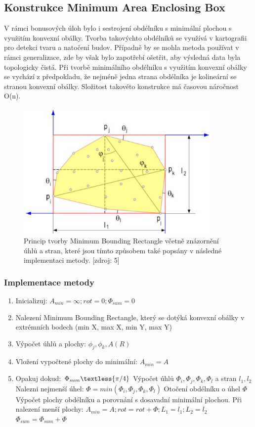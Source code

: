 \documentclass[a4paper, 12pt]{article}
\begin{document}
\subsection{Konstrukce Minimum Area Enclosing Box}
V rámci bonusových úloh bylo i sestrojení obdélníku s minimální plochou s využitím konvexní obálky. Tvorba takovýchto obdélníků se využívá v kartografii pro detekci tvaru a natočení budov. Případně by se mohla metoda používat v rámci generalizace, zde by však bylo zapotřebí ošetřit, aby výsledná data byla topologicky čistá. Při tvorbě minimálního obdélníku s využitím konvexní obálky se vychází z předpokladu, že nejméně jedna strana obdélníka je kolineární se stranou konvexní obálky. Složitost takovéto konstrukce má časovou náročnost O(n). 

\begin{figure}[h!]
	\centering
	\includegraphics[width=10cm]{mbr.jpg}
	\caption{Princip tvorby Minimum Bounding Rectangle včetně znázornění úhlů a stran, které jsou tímto způsobem také popsány v následné implementaci metody. [zdroj: 5]}
\end{figure}

\subsubsection{Implementace metody}
\begin{enumerate}
\item Inicializuj: $ A_{min} = \infty; rot = 0; \Phi_{sum} = 0$
\item Nalezení Minimum Bounding Rectangle, který se dotýká konvexní obálky v extrémních bodech (min X, max X, min Y, max Y)
\item Výpočet úhlů a plochy: $ \phi_j, \phi_k, A(R)$
\item Vložení vypočtené plochy do minimální: $A_{min} = A$
\item Opakuj dokud: $\Phi_{sum} \textless  {\pi/4}$
\subitem Výpočet úhlů $\Phi_i, \Phi_j, \Phi_k, \Phi_l$ a stran $l_1, l_2$
\subitem Nalezni nejmenší úhel: $\Phi = min(\Phi_i, \Phi_j, \Phi_k, \Phi_l)$
\subitem Otočení obdélníku o úhel $\Phi$
\subitem Výpočet plochy obdélníku a porovnání s dosavadní minimální plochou.
\subitem Při nalezení menší plochy: $A_{min} = A; rot = rot + \Phi; L_1 = l_1; L_2 = l_2$
\subitem $\Phi_{sum} = \Phi_{sum} + \Phi$
\end{enumerate}
\end{document}

